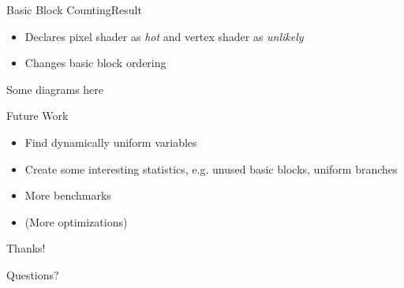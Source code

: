 \documentclass[xcolor={usenames,dvipsnames}, aspectratio=169, 12pt]{beamer}
\begin{document}
\begin{frame}{Basic Block Counting}{Result}
\begin{itemize}
	\item Declares pixel shader as \emph{hot} and vertex shader as \emph{unlikely}
	\item Changes basic block ordering
\end{itemize}
Some diagrams here
\end{frame}

{\framelogo{\centering}
\begin{frame}{Future Work}
\begin{itemize}
	\item Find dynamically uniform variables
	\item Create some interesting statistics, e.g. unused basic blocks, uniform branches
	\item More benchmarks
	\item (More optimizations)
\end{itemize}
\end{frame}}

\begin{tumplainframe}{Thanks!}
\begin{center}
	\Huge Questions?
\end{center}
\end{tumplainframe}
\end{document}
